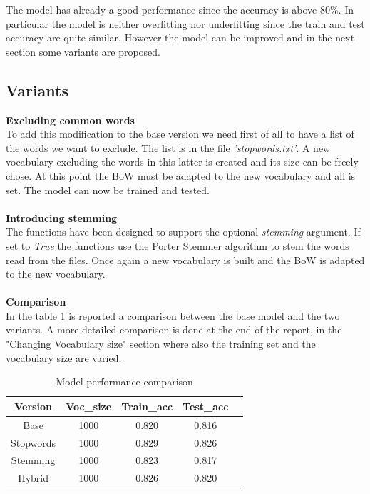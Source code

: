 \documentclass{article}
\begin{document}
\begin{multicols}{2}
\noindent
The model has already a good performance since the accuracy is above 80\%. In particular the model is neither overfitting nor underfitting since the train and test accuracy are
quite similar. However the model can be improved and in the next section some variants are proposed.\\
\subsection{Variants}

\textbf{Excluding common words}\\
To add this modification to the base version we need first of all to have a list of the words we want to exclude. The list is in the file \textit{'stopwords.txt'}.
A new vocabulary excluding the words in this latter is created and its size can be freely chose. At this
point the BoW must be adapted to the new vocabulary and all is set. The model can now be trained and tested.\\
\\
\textbf{Introducing stemming}\\
The functions have been designed to support the optional \textit{stemming} argument. If set to \textit{True} the
functions use the Porter Stemmer algorithm to stem the words read from the files. Once again a new vocabulary is built and the BoW is adapted to the new vocabulary.\\
\\
\textbf{Comparison}\\
In the table \ref{tab:comparison_table} is reported a comparison between the base model and the two variants. A more detailed comparison is done at the end of the report, 
in the "Changing Vocabulary size" section where also the training set and  the vocabulary size are varied.

    \begin{table}[H]
        \centering
        \small
        \caption{\small Model performance comparison}
        \label{tab:comparison_table}
        \begin{tabular}{|c|c|c|c|c|}
        \hline
        \textbf{Version} & \textbf{Voc\_size} & \textbf{Train\_acc} & \textbf{Test\_acc}\\\hline
        Base & 1000 & 0.820 & 0.816\\\hline
        Stopwords & 1000 & 0.829 & 0.826\\\hline
        Stemming & 1000 & 0.823 & 0.817\\\hline
        Hybrid & 1000 & 0.826 & 0.820\\\hline
        \end{tabular}
    \end{table}


\end{multicols}
\end{document}
